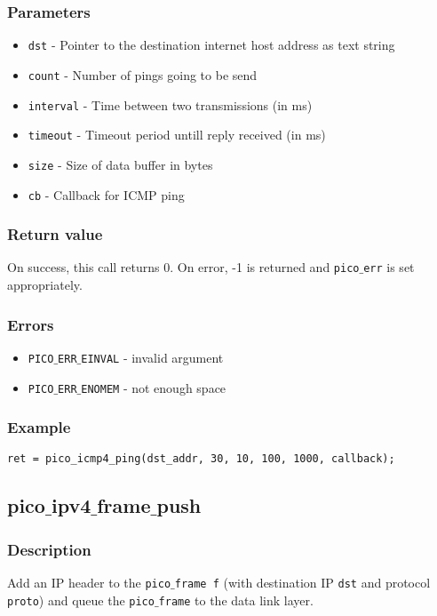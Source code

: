 \subsubsection*{Parameters}
\begin{itemize}[noitemsep]
\item \texttt{dst} - Pointer to the destination internet host address as text string
\item \texttt{count} - Number of pings going to be send
\item \texttt{interval} - Time between two transmissions (in ms)
\item \texttt{timeout} - Timeout period untill reply received (in ms)
\item \texttt{size} - Size of data buffer in bytes
\item \texttt{cb} - Callback for ICMP ping
\end{itemize}

\subsubsection*{Return value}
On success, this call returns 0.
On error, -1 is returned and \texttt{pico$\_$err} is set appropriately.

\subsubsection*{Errors}
\begin{itemize}[noitemsep]
\item \texttt{PICO$\_$ERR$\_$EINVAL} - invalid argument
\item \texttt{PICO$\_$ERR$\_$ENOMEM} - not enough space
\end{itemize}

\subsubsection*{Example}
\begin{verbatim}
ret = pico_icmp4_ping(dst_addr, 30, 10, 100, 1000, callback);
\end{verbatim}


\subsection{pico$\_$ipv4$\_$frame$\_$push}

\subsubsection*{Description}
Add an IP header to the \texttt{pico$\_$frame f} (with destination IP \texttt{dst} and protocol
\texttt{proto}) and queue the \texttt{pico$\_$frame} to the data link layer.

